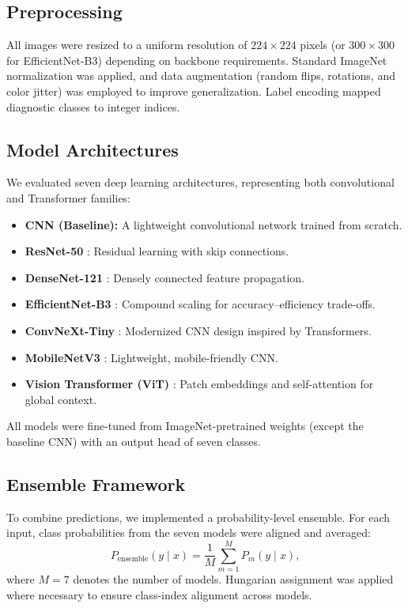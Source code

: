 \documentclass[preprint,12pt]{elsarticle}
\begin{document}
\subsection{Preprocessing}
All images were resized to a uniform resolution of $224 \times 224$ pixels (or $300 \times 300$ for EfficientNet-B3) depending on backbone requirements. Standard ImageNet normalization was applied, and data augmentation (random flips, rotations, and color jitter) was employed to improve generalization. Label encoding mapped diagnostic classes to integer indices.  

\subsection{Model Architectures}
We evaluated seven deep learning architectures, representing both convolutional and Transformer families:
\begin{itemize}[leftmargin=*]
  \item \textbf{CNN (Baseline):} A lightweight convolutional network trained from scratch.
  \item \textbf{ResNet-50} \citep{he2016resnet}: Residual learning with skip connections.
  \item \textbf{DenseNet-121} \citep{huang2017densenet}: Densely connected feature propagation.
  \item \textbf{EfficientNet-B3} \citep{tan2019efficientnet}: Compound scaling for accuracy–efficiency trade-offs.
  \item \textbf{ConvNeXt-Tiny} \citep{liu2022convnext}: Modernized CNN design inspired by Transformers.
  \item \textbf{MobileNetV3} \citep{howard2019mobilenetv3}: Lightweight, mobile-friendly CNN.
  \item \textbf{Vision Transformer (ViT)} \citep{dosovitskiy2021vit}: Patch embeddings and self-attention for global context.
\end{itemize}
All models were fine-tuned from ImageNet-pretrained weights (except the baseline CNN) with an output head of seven classes.

\subsection{Ensemble Framework}
To combine predictions, we implemented a probability-level ensemble. For each input, class probabilities from the seven models were aligned and averaged:
\[
P_{\text{ensemble}}(y \mid x) = \frac{1}{M} \sum_{m=1}^{M} P_m(y \mid x),
\]
where $M=7$ denotes the number of models. Hungarian assignment was applied where necessary to ensure class-index alignment across models.
\end{document}
